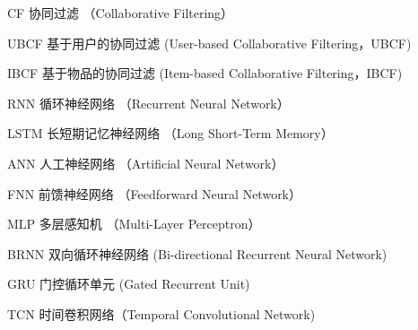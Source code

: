﻿\begin{denotation}


\item[CF] 协同过滤 （Collaborative Filtering）
\item[UBCF] 基于用户的协同过滤  (User-based Collaborative Filtering，UBCF)
\item[IBCF] 基于物品的协同过滤  (Item-based Collaborative Filtering，IBCF)
\item[RNN] 循环神经网络 （Recurrent Neural Network）
\item[LSTM] 长短期记忆神经网络 （Long Short-Term Memory）
\item[ANN] 人工神经网络 （Artificial Neural Network）
\item[FNN] 前馈神经网络 （Feedforward Neural Network）
\item[MLP] 多层感知机 （Multi-Layer Perceptron）
\item[BRNN] 双向循环神经网络 (Bi-directional Recurrent Neural Network)
\item[GRU] 门控循环单元 (Gated Recurrent Unit)
\item[TCN] 时间卷积网络（Temporal Convolutional Network)

\end{denotation}
